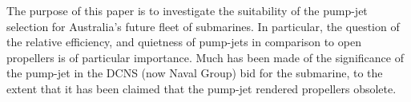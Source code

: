 \documentclass{article}
\begin{document}



The purpose of this paper is to investigate the suitability of the pump-jet selection for Australia's future fleet of submarines.  In particular, the question of the relative efficiency, and quietness of pump-jets in comparison to open propellers is of particular importance.  Much has been made of the significance of the pump-jet in the DCNS (now Naval Group) bid for the submarine, to the extent that it has been claimed that the pump-jet rendered propellers obsolete.
\end{document}
